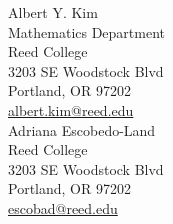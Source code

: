\documentclass{article}\usepackage[]{graphicx}\usepackage[]{color}
\begin{document}
\noindent\makebox[\linewidth]{\rule{\textwidth}{0.4pt}}

\noindent Albert Y. Kim\\
Mathematics Department\\
Reed College\\
3203 SE Woodstock Blvd\\
Portland, OR 97202\\
\url{albert.kim@reed.edu}\\

\noindent Adriana Escobedo-Land\\
Reed College\\
3203 SE Woodstock Blvd\\
Portland, OR 97202\\
\url{escobad@reed.edu}










%
%


\end{document}
